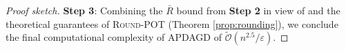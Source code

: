\begin{proof}[Proof sketch]
\textbf{Step 3}: 
Combining the $\bar{R}$ bound from \textbf{Step 2} in view of \citep[Proposition 4.10]{lin2019efficient} and the theoretical guarantees of \textsc{Round-POT} (Theorem \ref{prop:rounding}), we conclude the final computational complexity of APDAGD of $\widetilde{\mathcal{O}}(n^{2.5} / \varepsilon)$.
\end{proof}